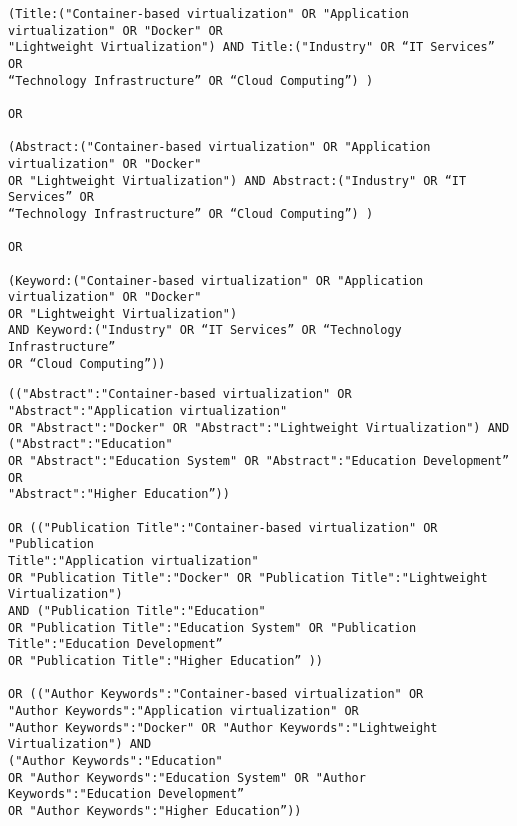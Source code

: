 \begin{tcolorbox}[
  colback=gray!5, 
  colframe=black!60, 
  title=Cadena de búsqueda en ACM para industria, 
  fonttitle=\bfseries, 
  sharp corners=south
]
\scriptsize %
\begin{verbatim}
(Title:("Container-based virtualization" OR "Application virtualization" OR "Docker" OR 
"Lightweight Virtualization") AND Title:("Industry" OR “IT Services” OR 
“Technology Infrastructure” OR “Cloud Computing”) ) 

OR

(Abstract:("Container-based virtualization" OR "Application virtualization" OR "Docker" 
OR "Lightweight Virtualization") AND Abstract:("Industry" OR “IT Services” OR 
“Technology Infrastructure” OR “Cloud Computing”) )

OR

(Keyword:("Container-based virtualization" OR "Application virtualization" OR "Docker" 
OR "Lightweight Virtualization")
AND Keyword:("Industry" OR “IT Services” OR “Technology Infrastructure” 
OR “Cloud Computing”))

\end{verbatim}
\end{tcolorbox}

\begin{tcolorbox}[
  colback=gray!5, 
  colframe=black!60, 
  title=Cadena de búsqueda en IEE para educación, 
  fonttitle=\bfseries, 
  sharp corners=south
]
\scriptsize %
\begin{verbatim}
(("Abstract":"Container-based virtualization" OR "Abstract":"Application virtualization" 
OR "Abstract":"Docker" OR "Abstract":"Lightweight Virtualization") AND ("Abstract":"Education" 
OR "Abstract":"Education System" OR "Abstract":"Education Development”  OR 
"Abstract":"Higher Education”)) 

OR (("Publication Title":"Container-based virtualization" OR "Publication 
Title":"Application virtualization" 
OR "Publication Title":"Docker" OR "Publication Title":"Lightweight Virtualization") 
AND ("Publication Title":"Education" 
OR "Publication Title":"Education System" OR "Publication Title":"Education Development”  
OR "Publication Title":"Higher Education” ))

OR (("Author Keywords":"Container-based virtualization" OR 
"Author Keywords":"Application virtualization" OR 
"Author Keywords":"Docker" OR "Author Keywords":"Lightweight Virtualization") AND 
("Author Keywords":"Education" 
OR "Author Keywords":"Education System" OR "Author Keywords":"Education Development”  
OR "Author Keywords":"Higher Education”))
\end{verbatim}
\end{tcolorbox}


